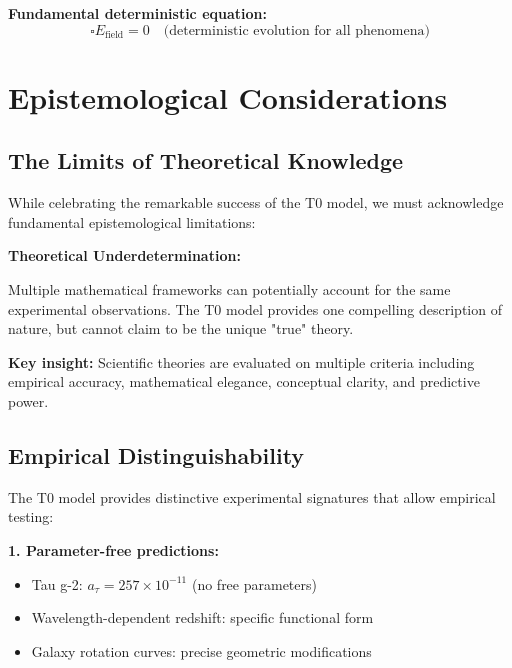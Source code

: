 \documentclass[12pt,a4paper]{report}
\begin{document}
\textbf{Fundamental deterministic equation:}
\begin{equation}
	\square E_{\text{field}} = 0 \quad \text{(deterministic evolution for all phenomena)}
\end{equation}

\section{Epistemological Considerations}
\label{sec:epistemological_considerations}

\subsection{The Limits of Theoretical Knowledge}
\label{subsec:limits_theoretical_knowledge}

While celebrating the remarkable success of the T0 model, we must acknowledge fundamental epistemological limitations:

\begin{tcolorbox}[colback=yellow!5!white,colframe=orange!75!black,title=Epistemological Humility]
	\textbf{Theoretical Underdetermination:}
	
	Multiple mathematical frameworks can potentially account for the same experimental observations. The T0 model provides one compelling description of nature, but cannot claim to be the unique "true" theory.
	
	\textbf{Key insight:} Scientific theories are evaluated on multiple criteria including empirical accuracy, mathematical elegance, conceptual clarity, and predictive power.
\end{tcolorbox}

\subsection{Empirical Distinguishability}
\label{subsec:empirical_distinguishability}

The T0 model provides distinctive experimental signatures that allow empirical testing:

\textbf{1. Parameter-free predictions:}
\begin{itemize}
	\item Tau g-2: $a_\tau = 257 \times 10^{-11}$ (no free parameters)
	\item Wavelength-dependent redshift: specific functional form
	\item Galaxy rotation curves: precise geometric modifications
\end{itemize}
\end{document}
